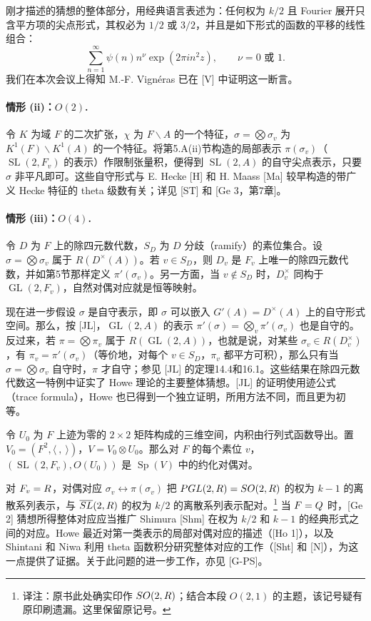 刚才描述的猜想的整体部分，用经典语言表述为：任何权为 $k/2$ 且 Fourier 展开只含平方项的尖点形式，其权必为 $1/2$ 或 $3/2$，并且是如下形式的函数的平移的线性组合：
\[
 \sum_{n=1}^{\infty}\psi(n)n^\nu\exp(2\pi i n^2z),\qquad\nu=0\text{ 或 }1.
\]
我们在本次会议上得知 M.-F. Vignéras 已在 [V] 中证明这一断言。

\paragraph*{情形 (ii)：$O(2)$.}
令 $K$ 为域 $F$ 的二次扩张，$\chi$ 为 $F\backslash A$ 的一个特征，$\sigma=\bigotimes\sigma_v$ 为 $K^1(F)\backslash K^1(A)$ 的一个特征。将第5.A(ii)节构造的局部表示 $\pi(\sigma_v)$（$\operatorname{SL}(2,F_v)$ 的表示）作限制张量积，便得到 $\operatorname{SL}(2,A)$ 的自守尖点表示，只要 $\sigma$ 非平凡即可。这些自守形式与 E. Hecke [H] 和 H. Maass [Ma] 较早构造的带广义 Hecke 特征的 theta 级数有关；详见 [ST] 和 [Ge 3，第7章]。

\paragraph*{情形 (iii)：$O(4)$.}
令 $D$ 为 $F$ 上的除四元数代数，$S_D$ 为 $D$ 分歧（ramify）的素位集合。设 $\sigma=\bigotimes\sigma_v$ 属于 $R(D^\times(A))$。若 $v\in S_D$，则 $D_v$ 是 $F_v$ 上唯一的除四元数代数，并如第5节那样定义 $\pi'(\sigma_v)$。另一方面，当 $v\notin S_D$ 时，$D_v^\times$ 同构于 $\operatorname{GL}(2,F_v)$，自然对偶对应就是恒等映射。

现在进一步假设 $\sigma$ 是自守表示，即 $\sigma$ 可以嵌入 $G'(A)=D^\times(A)$ 上的自守形式空间。那么，按 [JL]，$\operatorname{GL}(2,A)$ 的表示 $\pi'(\sigma)=\bigotimes_v\pi'(\sigma_v)$ 也是自守的。反过来，若 $\pi=\bigotimes\pi_v$ 属于 $R(\operatorname{GL}(2,A))$，也就是说，对某些 $\sigma_v\in R(D_v^\times)$，有 $\pi_v=\pi'(\sigma_v)$（等价地，对每个 $v\in S_D$，$\pi_v$ 都平方可积），那么只有当 $\sigma=\bigotimes\sigma_v$ 自守时，$\pi$ 才自守；参见 [JL] 的定理14.4和16.1。这些结果在除四元数代数这一特例中证实了 Howe 理论的主要整体猜想。[JL] 的证明使用迹公式（trace formula），Howe 也已得到一个独立证明，所用方法不同，而且更为初等。

令 $U_0$ 为 $F$ 上迹为零的 $2\times2$ 矩阵构成的三维空间，内积由行列式函数导出。置 $V_0=(F^2,\langle\ ,\ \rangle)$，$V=V_0\otimes U_0$。那么对 $F$ 的每个素位 $v$，$(\operatorname{SL}(2,F_v),O(U_0))$ 是 $\operatorname{Sp}(V)$ 中的约化对偶对。

对 $F_v=R$，对偶对应 $\sigma_v\leftrightarrow\pi(\sigma_v)$ 把 $PGL(2,R)=SO(2,R)$ 的权为 $k-1$ 的离散系列表示，与 $\overline{SL}(2,R)$ 的权为 $k/2$ 的离散系列表示配对。\footnote{译注：原书此处确实印作 $SO(2,R)$；结合本段 $O(2,1)$ 的主题，该记号疑有原印刷遗漏。这里保留原记号。} 当 $F=Q$ 时，[Ge 2] 猜想所得整体对应应当推广 Shimura [Shm] 在权为 $k/2$ 和 $k-1$ 的经典形式之间的对应。Howe 最近对第一类表示的局部对偶对应的描述（[Ho 1]），以及 Shintani 和 Niwa 利用 theta 函数积分研究整体对应的工作（[Sht] 和 [N]），为这一点提供了证据。关于此问题的进一步工作，亦见 [G-PS]。

